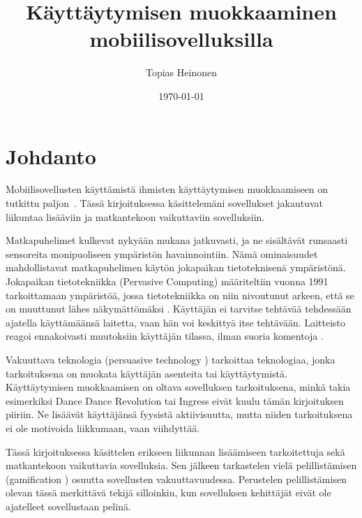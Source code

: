 \documentclass[finnish]{tktltiki2}
\title{Käyttäytymisen muokkaaminen mobiilisovelluksilla}
\author{Topias Heinonen}
\date{\today}
\theoremstyle{definition}
\theoremstyle{remark}
\begin{document}

\frontmatter      %

\maketitle        %
\makeabstract     %

\tableofcontents  %


\mainmatter       %

\section{Johdanto}

Mobiilisovellusten käyttämistä ihmisten käyttäytymisen muokkaamiseen on tutkittu paljon~\cite{houston, ubifit, ubigreen, obesity, movipill, tripzoom, fitocracy}.
Tässä kirjoituksessa käsittelemäni sovellukset jakautuvat liikuntaa lisääviin ja matkantekoon vaikuttaviin sovelluksiin.

Matkapuhelimet kulkevat nykyään mukana jatkuvasti, ja ne sisältävät runsaasti sensoreita monipuoliseen ympäristön havainnointiin. Nämä ominaisuudet mahdollistavat matkapuhelimen käytön jokapaikan tietoteknisenä ympäristönä. 
Jokapaikan tietotekniikka (Pervasive Computing) määriteltiin vuonna 1991 tarkoittamaan ympäristöä, jossa tietotekniikka on niin nivoutunut arkeen, että se on muuttunut lähes näkymättömäksi \cite{weiser}.
Käyttäjän ei tarvitse tehtävää tehdessään ajatella käyttämäänsä laitetta, vaan hän voi keskittyä itse tehtävään.
Laitteisto reagoi ennakoivasti muutoksiin käyttäjän tilassa, ilman suoria komentoja \cite{pervasive}.

Vakuuttava teknologia (persuasive technology \cite{fogg1998}) tarkoittaa teknologiaa, jonka tarkoituksena on muokata käyttäjän asenteita tai käyttäytymistä. Käyttäytymisen muokkaamisen on oltava sovelluksen tarkoituksena, minkä takia esimerkiksi Dance Dance Revolution tai Ingress eivät kuulu tämän kirjoituksen piiriin. Ne lisäävät käyttäjänsä fyysistä aktiivisuutta, mutta niiden tarkoituksena ei ole motivoida liikkumaan, vaan viihdyttää.

Tässä kirjoituksessa käsittelen erikseen liikunnan lisäämiseen tarkoitettuja sekä matkantekoon vaikuttavia sovelluksia.
Sen jälkeen tarkastelen vielä pelillistämisen (gamification \cite{gamification}) osuutta sovellusten vakuuttavuudessa.
Perustelen pelillistämisen olevan tässä merkittävä tekijä silloinkin, kun sovelluksen kehittäjät eivät ole ajatelleet sovellustaan pelinä.
\end{document}
